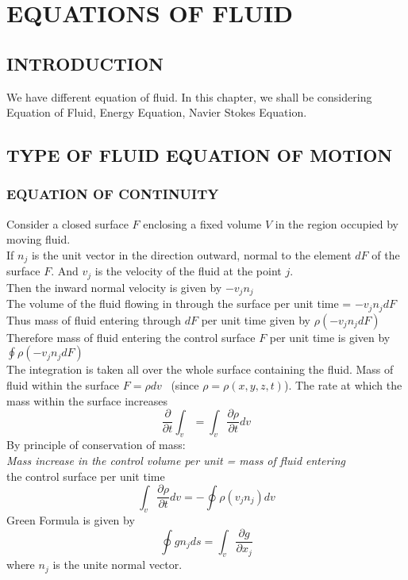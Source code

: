 \documentclass[11pt]{report}
\newcommand{\sps}{\\[0.2cm]}
\newcommand{\dsp}{\displaystyle}
\begin{document}
	\chapter{EQUATIONS OF FLUID}
	\section{INTRODUCTION}
	We have different equation of fluid. In this chapter, we shall be considering Equation of Fluid, Energy Equation, Navier Stokes Equation.
	
	\section{TYPE OF FLUID EQUATION OF MOTION}
	\subsection{EQUATION OF CONTINUITY}
	Consider a closed surface $F$ enclosing a fixed volume $V$ in the region occupied by moving fluid.\sps
	If $n_j$ is the unit vector in the direction outward, normal to the element $dF$ of the surface $F$. And $v_j$ is the velocity of the fluid at the point $j$.\sps
	Then the inward normal velocity is given by $-v_jn_j$\sps
	The volume of the fluid flowing in through the surface per unit time = $-v_jn_j dF$\sps
	Thus mass of fluid entering through $dF$ per unit time given by $\rho(-v_jn_jdF)$\sps
	Therefore mass of fluid entering the control surface $F$ per unit time is given by $\dsp\oint\rho(-v_jn_jdF)$\sps
	The integration is taken all over the whole surface containing the fluid. Mass of fluid within the surface $F=\rho dv$ ~(since $\rho=\rho(x,y,z,t)$). The rate at which the mass within the surface increases
	\begin{equation}
		\frac{\partial}{\partial t}\int_v = \int_v\frac{\partial \rho}{\partial t}dv
	\end{equation}
	By principle of conservation of mass:\\
	\textit{Mass increase in the control volume per unit = mass of fluid entering}\sps
	the control surface per unit time
	\begin{equation}
		\int_v\frac{\partial\rho}{\partial t} dv = - \oint \rho(v_j n_j)dv \label{eq:2_2}
	\end{equation}
	Green Formula is given by
	\begin{equation}
		\oint gn_j ds = \int_v \frac{\partial g}{\partial x_j}\label{eq:2_3}
	\end{equation}
	where $n_j$ is the unite normal vector.\\
	
\end{document}
